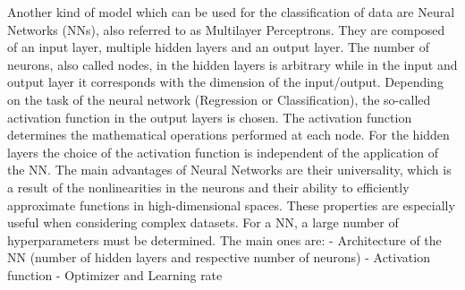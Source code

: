 \documentclass[12pt]{report}
\begin{document}
Another kind of model which can be used for the classification of data are Neural Networks (NNs), also referred to as Multilayer Perceptrons. They are composed of an input layer, multiple hidden layers and an output layer. The number of neurons, also called nodes, in the hidden layers is arbitrary while in the input and output layer it corresponds with the dimension of the input/output. Depending on the task of the neural network (Regression or Classification), the so-called activation function in the output layers is chosen. The activation function determines the mathematical operations performed at each node. For the hidden layers the choice of the activation function is independent of the application of the NN.
The main advantages of Neural Networks are their universality, which is a result of the nonlinearities in the neurons and their ability to efficiently approximate functions in high-dimensional spaces. These properties are especially useful when considering complex datasets.
For a NN, a large number of hyperparameters must be determined. The main ones are:\newline\newline
-	Architecture of the NN (number of hidden layers and respective number of neurons)\newline
-	Activation function\newline
-	Optimizer and Learning rate\newline\newline
\end{document}
